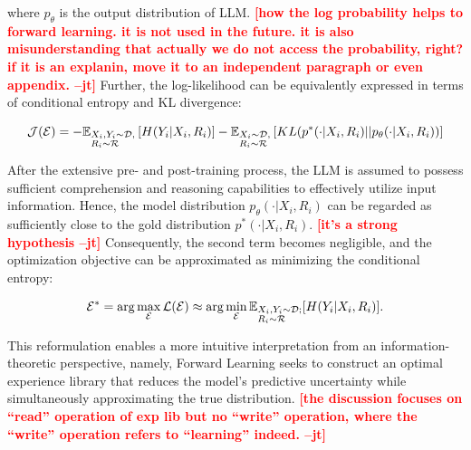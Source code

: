 \documentclass{article}
\newcommand{\method}{Forward Learning}
\newcommand{\jiangtao}[1]{\textcolor{red}{\bf \small [#1 --jt]}}
\begin{document}
where $p_{\theta}$ is the output distribution of LLM. \jiangtao{how the log probability helps to forward learning. it is not used in the future. it is also misunderstanding that actually we do not access the probability, right? if it is an explanin, move it to an independent paragraph or even appendix.} Further, the log-likelihood can be equivalently expressed in terms of conditional entropy and KL divergence:

\begin{equation}
\mathcal{J}(\mathcal{E}) = -\mathbb{E}_{\begin{subarray}{l}
X_i,Y_i\sim\mathcal{D},\\
R_i\sim\mathcal{R}
\end{subarray}}\left[H(Y_i|X_i,R_i)\right]-\mathbb{E}_{\begin{subarray}{l}
X_i\sim\mathcal{D},\\
R_i\sim\mathcal{R}
\end{subarray}}\left[KL(p^*(\cdot|X_i,R_i)||p_{\theta}(\cdot|X_i,R_i))\right]
\end{equation}

After the extensive pre- and post-training process, the LLM is assumed to possess sufficient comprehension and reasoning capabilities to effectively utilize input information. 
Hence, the model distribution $p_{\theta}(\cdot|X_i,R_i)$ can be regarded as sufficiently close to the gold distribution $p^*(\cdot|X_i,R_i)$. \jiangtao{it's a strong hypothesis}
Consequently, the second term becomes negligible, and the optimization objective can be approximated as minimizing the conditional entropy:

\begin{equation}
{\mathcal{E}}^*=
\arg\max_{\mathcal{E}}\mathcal{L}(\mathcal{E}) 
\approx 
\arg\min_{\mathcal{E}}\mathbb{E}_{\begin{subarray}{l}
X_i,Y_i\sim\mathcal{D};\\
R_i\sim\mathcal{R}
\end{subarray}}[H(Y_i|X_i,R_i)].
\end{equation}

This reformulation enables a more intuitive interpretation from an information-theoretic perspective, namely, \method{} seeks to construct an optimal experience library that reduces the model’s predictive uncertainty while simultaneously approximating the true distribution.
\jiangtao{the discussion focuses on ``read'' operation of exp lib but no ``write'' operation, where the ``write'' operation refers to ``learning'' indeed.}
\end{document}
